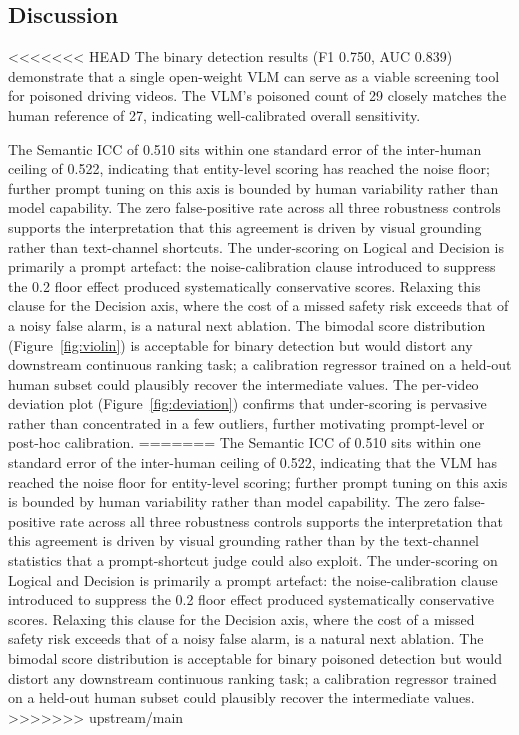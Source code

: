 \documentclass[letterpaper]{article}
\begin{document}
\subsection{Discussion}
<<<<<<< HEAD
The binary detection results (F1 0.750, AUC 0.839) demonstrate that
a single open-weight VLM can serve as a viable screening tool for
poisoned driving videos. The VLM's poisoned count of 29 closely
matches the human reference of 27, indicating well-calibrated
overall sensitivity.

The Semantic ICC of 0.510 sits within one standard error of the
inter-human ceiling of 0.522, indicating that entity-level scoring
has reached the noise floor; further prompt tuning on this axis is
bounded by human variability rather than model capability. The zero
false-positive rate across all three robustness controls supports the
interpretation that this agreement is driven by visual grounding
rather than text-channel shortcuts. The under-scoring on Logical and
Decision is primarily a prompt artefact: the noise-calibration clause
introduced to suppress the 0.2 floor effect produced systematically
conservative scores. Relaxing this clause for the Decision axis,
where the cost of a missed safety risk exceeds that of a noisy false
alarm, is a natural next ablation. The bimodal score distribution
(Figure~\ref{fig:violin}) is acceptable for binary detection but
would distort any downstream continuous ranking task; a calibration
regressor trained on a held-out human subset could plausibly recover
the intermediate values. The per-video deviation plot
(Figure~\ref{fig:deviation}) confirms that under-scoring is pervasive
rather than concentrated in a few outliers, further motivating
prompt-level or post-hoc calibration.
=======
The Semantic ICC of 0.510 sits within one standard error of the
inter-human ceiling of 0.522, indicating that the VLM has reached
the noise floor for entity-level scoring; further prompt tuning on
this axis is bounded by human variability rather than model
capability. The zero false-positive rate across all three robustness
controls supports the interpretation that this agreement is driven
by visual grounding rather than by the text-channel statistics that
a prompt-shortcut judge could also exploit. The under-scoring on Logical and Decision is primarily
a prompt artefact: the noise-calibration clause introduced to
suppress the 0.2 floor effect produced systematically conservative
scores. Relaxing this clause for the Decision axis, where the cost
of a missed safety risk exceeds that of a noisy false alarm, is a
natural next ablation. The bimodal score distribution is acceptable
for binary poisoned detection but would distort any downstream
continuous ranking task; a calibration regressor trained on a
held-out human subset could plausibly recover the intermediate
values.
>>>>>>> upstream/main
\end{document}
